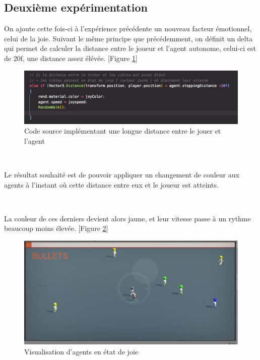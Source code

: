 \subsection{Deuxième expérimentation}

On ajoute cette fois-ci à l'expérience précédente un nouveau facteur émotionnel, celui de la joie.
Suivant le même principe que précédemment, on définit un delta qui permet de calculer la distance entre le joueur et l’agent autonome, celui-ci est de 20f, une distance assez élévée. [Figure \ref{fig:fonct2}]

\begin{figure}[th]
\centering
\includegraphics{Figures/fonct2.JPG}
\decoRule
\caption[Code source implémentant une longue distance]{Code source implémentant une longue distance entre le jouer et l'agent}
\label{fig:fonct2}
\end{figure}



~\par
Le résultat souhaité est de pouvoir appliquer un changement de couleur aux agents à l’instant où cette distance entre eux et le joueur est atteints.

~\par
La couleur de ces derniers devient alors jaune, et leur vitesse passe à un rythme beaucoup moins élevée. [Figure \ref{fig:bichi2}]

\begin{figure}[th]
\centering
\includegraphics{Figures/bichi2.JPG}
\decoRule
\caption[Visualisation d'agents en état de joie]{Visualisation d'agents en état de joie}
\label{fig:bichi2}
\end{figure}


